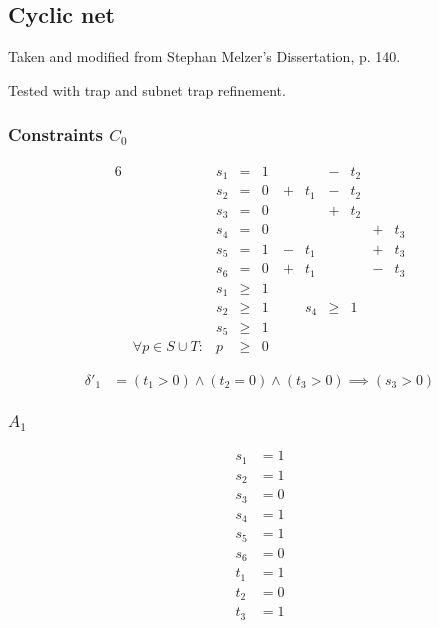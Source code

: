 \documentclass{article}
\begin{document}
\subsection{Cyclic net}

Taken and modified from Stephan Melzer's Dissertation, p. 140.

Tested with trap and subnet trap refinement.

\begin{dot2tex}[dot,options=-tmath]

\end{dot2tex}

\subsubsection{Constraints $C_0$}

\begin{alignat*}{6}
&& s_1 &{}={}&   1 &     &     &{}-{}& t_2 &     &     \\
&& s_2 &{}={}&   0 &{}+{}& t_1 &{}-{}& t_2 &     &     \\
&& s_3 &{}={}&   0 &     &     &{}+{}& t_2 &     &     \\
&& s_4 &{}={}&   0 &     &     &     &     &{}+{}& t_3 \\
&& s_5 &{}={}&   1 &{}-{}& t_1 &     &     &{}+{}& t_3 \\
&& s_6 &{}={}&   0 &{}+{}& t_1 &     &     &{}-{}& t_3 \\
&& s_1 &{}\ge{}& 1 \\
&& s_2 &{}\ge{}& 1 \
&& s_4 &{}\ge{}& 1 \\
&& s_5 &{}\ge{}& 1 \\
&\forall p \in S \cup T:& p &{}\ge{}& 0
\end{alignat*}

\begin{align*}
  \delta'_1 &= (t_1 > 0) \land (t_2 = 0) \land (t_3 > 0) \implies (s_3 > 0)
\end{align*}

\subsubsection{$A_1$}
\begin{align*}
  s_1 &= 1 \\
  s_2 &= 1 \\
  s_3 &= 0 \\
  s_4 &= 1 \\
  s_5 &= 1 \\
  s_6 &= 0 \\
  t_1 &= 1 \\
  t_2 &= 0 \\
  t_3 &= 1
\end{align*}
\end{document}
